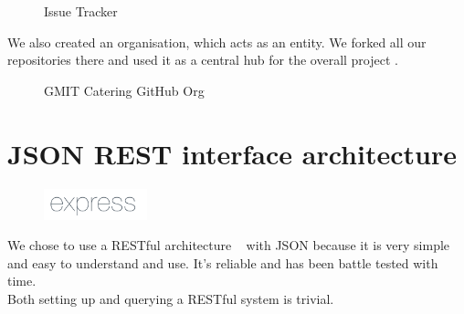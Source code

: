   \begin{figure}[H] 
  	\caption{Issue Tracker}
  \end{figure}
  
  
  We also created an organisation, which acts as an entity.
  We forked all our repositories there and used it as a central hub for the overall project \cite{github_org}.
  \begin{figure}[H] 
  	\caption{GMIT Catering GitHub Org}
  	\label{fig:speciation}
  \end{figure}
  
  \section{JSON REST interface architecture}	%
  \begin{figure}
  	\includegraphics[width=3cm]{img/mobile-app/logos/express.png}
  \end{figure} 
We chose to use a RESTful architecture   ~\cite{JSON_REST_interface} with JSON   \cite{json} because it is very simple and easy to understand and use.
It's reliable and has been battle tested with time.
\\
Both setting up and querying a RESTful system is trivial.
  

